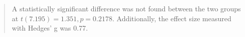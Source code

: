 \begin{quote}
	A statistically significant difference was not found between the two groups at $t(7.195)=1.351,p = 0.2178$. Additionally, the effect size measured with Hedges' g was 0.77.
\end{quote}
